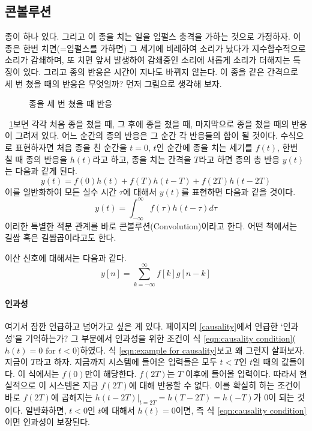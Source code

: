 \subsection{콘볼루션}
종이 하나 있다. 그리고 이 종을 치는 일을 임펄스 충격을 가하는 것으로 가정하자.
이 종은 한번 치면(=임펄스를 가하면) 그 세기에 비례하여 소리가 났다가 지수함수적으로 소리가 감쇄하며, 또 치면 앞서 발생하여 감쇄중인 소리에 새롭게 소리가 더해지는 특징이 있다. 그리고 종의 반응은 시간이 지나도 바뀌지 않는다.
이 종을 같은 간격으로 세 번 쳤을 때의 반응은 무엇일까?
먼저 그림으로 생각해 보자.
\begin{figure}
    \centering
    \caption{종을 세 번 쳤을 때 반응}\label{fig:bell response}
\end{figure}
\figurename~\ref{fig:bell response}\을 보면 각각 처음 종을 쳤을 때, 그 후에 종을 쳤을 때, 마지막으로 종을 쳤을 때의 반응이 그려져 있다. 어느 순간의 종의 반응은 그 순간 각 반응들의 합이 될 것이다.
수식으로 표현하자면 처음 종을 친 순간을 $t=0$, $t$인 순간에 종을 치는 세기를 $f(t)$, 한번 칠 때 종의 반응을 $h(t)$라고 하고, 종을 치는 간격을 $T$라고 하면 종의 총 반응 $y(t)$는 다음과 같게 된다.
\begin{equation}
    y(t)=f(0)h(t)+f(T)h(t-T)+f(2T)h(t-2T)\label{eqn:example for causality}
\end{equation}
이를 일반화하여 모든 실수 시간 $\tau$에 대해서 $y(t)$를 표현하면 다음과 같을 것이다.
\begin{equation}
    y(t) =\int_{-\infty}^{\infty}f(\tau)h(t-\tau)d\tau\label{eqn:convolution}
\end{equation}
이러한 특별한 적분 관계를 바로 콘볼루션(Convolution)이라고 한다. 어떤 책에서는 길쌈 혹은 길쌈곱이라고도 한다.
\par
이산 신호에 대해서는 다음과 같다.
\begin{equation}
    y[n]=\sum_{k=-\infty}^{\infty}f[k]g[n-k]\label{eqn:conv of disc}
\end{equation}
\paragraph{인과성}\label{인과성 해설} 여기서 잠깐 언급하고 넘어가고 싶은 게 있다. \pageref{causality} 페이지의 \ref{causality}에서 언급한 `인과성'을 기억하는가?
그 부분에서 인과성을 위한 조건이 식 \ref{eqn:causality condition}($h(t)=0\text{ for }t<0$) 하였다.
식 \ref{eqn:example for causality}\을 보고 왜 그런지 살펴보자.
지금이 $T$라고 하자. 지금까지 시스템에 들어온 입력들은 모두 $t<T$인 $t$일 때의 값들이다. 이 식에서는 $f(0)$만이 해당한다. $f(2T)$는 $T$ 이후에 들어올 입력이다.
따라서 현실적으로 이 시스템은 지금 $f(2T)$에 대해 반응할 수 없다. 이를 확실히 하는 조건이 바로 $f(2T)$에 곱해지는 $h(t-2T)\vert_{t=2T}=h(T-2T)=h(-T)$가 0이 되는 것이다.
일반화하면, $t<0$인 $t$에 대해서 $h(t)=0$이면, 즉 식 \ref{eqn:causality condition}이면 인과성이 보장된다.

